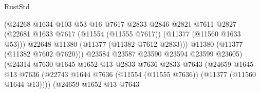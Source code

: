 \begin{lexlean}{RustStd}
\begin{coremodule}
                                            (@24268
                                              @1634
                                              @103
                                              @53
                                              @16
                                              @7617
                                              @2833
                                              @2846
                                              @2821
                                              @7611
                                              @2827
                                              (@22681
                                                @1633
                                                @7617
                                                (@11554 (@11555 @7617))
                                                (@11377 (@11560 @1633 @53)))
                                              @22648
                                              @11380
                                              (@11377 (@11382 @7612 @2833)))
                                            @11380
                                            (@11377 (@11382 @7602 @7620)))
                                          @23584
                                          @23587
                                          @23590
                                          @23594
                                          @23599
                                          @23605)
                                        (@24314
                                          @7630
                                          @1645
                                          @1652
                                          @13
                                          @2833
                                          @7636
                                          @2833
                                          @7643
                                          (@24659
                                            @1645
                                            @13
                                            @7636
                                            (@22743
                                              @1644
                                              @7636
                                              (@11554 (@11555 @7636))
                                              (@11377 (@11560 @1644 @13))))
                                          (@24659
                                            @1652
                                            @13
                                            @7643

\end{coremodule}
\end{lexlean}

